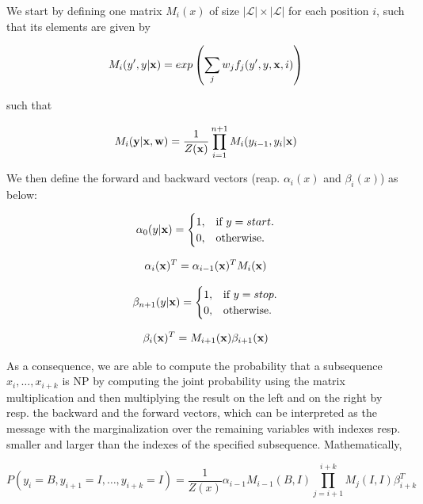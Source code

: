 \documentclass{article}
\begin{document}
\begin{enumerate}
We start by defining one matrix $M_i(x)$ of size $|\mathcal{L}|\times|\mathcal{L}|$ for each position $i$, such that its elements are given by

\begin{equation*}
M_i(y',y|{\bf x}) = exp\left(\sum_j w_jf_j(y',y,{\bf x},i)\right)
\end{equation*}

such that

\begin{equation*}
M_i({\bf y}|{\bf x},{\bf w}) = \frac{1}{Z({\bf x})}\prod_{i=1}^{n+1} M_i(y_{i-1},y_i|{\bf x})
\end{equation*}

We then define the forward and backward vectors (reap. $\alpha_i(x)$ and $\beta_i(x)$) as below:

\begin{equation*}
\alpha_0(y|{\bf x})=\begin{cases}
    1, & \text{if $y=start$}.\\
    0, & \text{otherwise}.
  \end{cases}
\end{equation*}

\begin{equation*}
\alpha_i({\bf x})^T = \alpha_{i-1}({\bf x})^TM_i({\bf x})
\end{equation*}

\begin{equation*}
\beta_{n+1}(y|{\bf x})=\begin{cases}
    1, & \text{if $y=stop$}.\\
    0, & \text{otherwise}.
  \end{cases}
\end{equation*}

\begin{equation*}
\beta_i({\bf x})^T = M_{i+1}({\bf x})\beta_{i+1}({\bf x})
\end{equation*}

As a consequence, we are able to compute the probability that a subsequence ${x_i,\dots,x_{i+k}}$ is NP by computing the joint probability using the matrix multiplication and then multiplying the result on the left and on the right by resp. the backward and the forward vectors, which can be interpreted as the message with the marginalization over the remaining variables with indexes resp. smaller and larger than the indexes of the specified subsequence. Mathematically, 

\begin{equation*}
P(y_i = B, y_{i+1} = I, \dots, y_{i+k} =I) = \frac{1}{Z(x)}\alpha_{i-1} M_{i-1}(B, I) \prod_{j=i+1}^{i+k} M_j(I, I) \beta_{i+k}^T
\end{equation*}



\end{enumerate}
\end{document}
